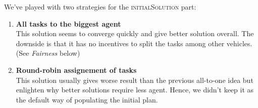\documentclass[11pt,a4paper]{article}
\begin{document}
We've played with two strategies for the \textsc{initialSolution} part:

\begin{enumerate}
    \item \textbf{All tasks to the biggest agent}\\
        This solution seems to converge quickly and give better solution
        overall. The downside is that it has no incentives to split the tasks
        among other vehicles. (See \emph{Fairness} below)

    \item \textbf{Round-robin assignement of tasks}\\
        This solution usually gives worse result than the previous all-to-one
        idea but enlighten why better solutions require less agent. Hence, we
        didn't keep it as the default way of populating the initial plan.

\end{enumerate}

\end{document}
